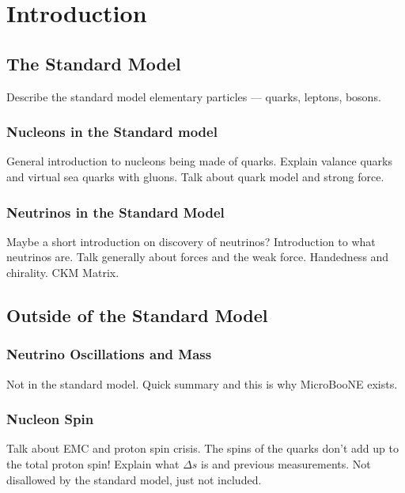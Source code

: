 \section{Introduction} \label{sec:intro}
\hspace{\parindent}

\subsection{The Standard Model}\label{sec:standardmodel}
  Describe the standard model elementary particles --- quarks, leptons, bosons.

  \subsubsection{Nucleons in the Standard model}
    General introduction to nucleons being made of quarks. Explain valance quarks
    and virtual sea quarks with gluons.  Talk about quark model and strong force.

  \subsubsection{Neutrinos in the Standard Model}
    Maybe a short introduction on discovery of neutrinos?
    Introduction to what neutrinos are. Talk generally about forces and the
    weak force.  Handedness and chirality. CKM Matrix.

\subsection{Outside of the Standard Model}\label{sec:bsm}

  \subsubsection{Neutrino Oscillations and Mass}
  Not in the standard model. Quick summary and this is why MicroBooNE exists.

  \subsubsection{Nucleon Spin}\label{sec:nucleonbsm}
  Talk about EMC and proton spin crisis. The spins of the quarks don't add up
  to the total proton spin! Explain what $\Delta s$ is and previous
  measurements.
  Not disallowed by the standard model, just not included.

